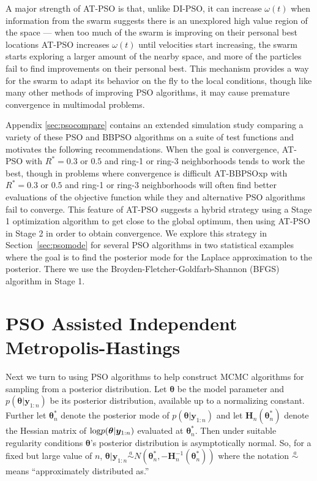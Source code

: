 \documentclass[12pt]{article}
\def\log{\hbox{log}}
\begin{document}
A major strength of AT-PSO is that, unlike DI-PSO, it can increase $\omega(t)$ when information from the swarm suggests there is an unexplored high value region of the space --- when too much of the swarm is improving on their personal best locations AT-PSO increases $\omega(t)$ until velocities start increasing, the swarm starts exploring a larger amount of the nearby space, and more of the particles fail to find improvements on their personal best. This mechanism provides a way for the swarm to adapt its behavior on the fly to the local conditions, though like many other methods of improving PSO algorithms, it may cause premature convergence in multimodal problems.

Appendix \ref{sec:psocompare} contains an extended simulation study comparing a variety of these PSO and BBPSO algorithms on a suite of test functions and motivates the following recommendations. When the goal is convergence, AT-PSO with $R^*=0.3$ or $0.5$ and ring-1 or ring-3 neighborhoods tends to work the best, though in problems where convergence is difficult AT-BBPSOxp with $R^*=0.3$ or $0.5$ and ring-1 or ring-3 neighborhoods will often find better evaluations of the objective function while they and alternative PSO algorithms fail to converge. This feature of AT-PSO suggests a hybrid strategy using a Stage 1 optimization algorithm to get close to the global optimum, then using AT-PSO in Stage 2 in order to obtain convergence. We explore this strategy in Section~\ref{sec:psomode} for several PSO algorithms in two statistical examples where the goal is to find the posterior mode for the Laplace approximation to the posterior. There we use the Broyden-Fletcher-Goldfarb-Shannon (BFGS) algorithm in Stage 1.




\section{PSO Assisted Independent Metropolis-Hastings}\label{sec:psometrop}
Next we turn to using PSO algorithms to help construct MCMC algorithms for sampling from a posterior distribution. Let $\bm{\theta}$ be the model parameter and $ p(\bm{\theta}|\bm{y}_{1:n})$ be its posterior distribution, available up to a normalizing constant. Further let $\bm{\theta}^*_n$ denote the posterior mode of $p(\bm{\theta}|\bm{y}_{1:n})$ and let $\bm{H}_n(\bm{\theta}^*_n)$ denote the Hessian matrix of $\log p(\bm{\theta}|\bm{y}_{1:n})$ evaluated at $\bm{\theta}_n^*$. Then under suitable regularity conditions \citep[Sections~7.4.2~and~7.4.3]{schervish1997theory} $\bm{\theta}$'s posterior distribution is asymptotically normal. So, for a fixed but large value of $n$, $\bm{\theta}|\bm{y}_{1:n} \stackrel{a}{\sim} N(\bm{\theta}_n^*, -\bm{H}_n^{-1}(\bm{\theta}^*_n))$ where the notation $\stackrel{a}{\sim}$ means ``approximately distributed as.''
\end{document}
